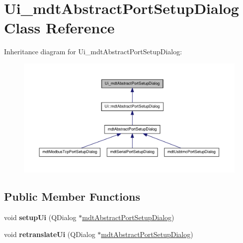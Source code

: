 \hypertarget{class_ui__mdt_abstract_port_setup_dialog}{
\section{Ui\_\-mdtAbstractPortSetupDialog Class Reference}
\label{class_ui__mdt_abstract_port_setup_dialog}
}


Inheritance diagram for Ui\_\-mdtAbstractPortSetupDialog:\nopagebreak
\begin{figure}[H]
\begin{center}
\leavevmode
\includegraphics[width=400pt]{class_ui__mdt_abstract_port_setup_dialog__inherit__graph}
\end{center}
\end{figure}
\subsection*{Public Member Functions}
\begin{DoxyCompactItemize}
\item 
\hypertarget{class_ui__mdt_abstract_port_setup_dialog_a5b5b735fa4c40a033a360f4311e193e5}{
void {\bfseries setupUi} (QDialog $\ast$\hyperlink{classmdt_abstract_port_setup_dialog}{mdtAbstractPortSetupDialog})}
\label{class_ui__mdt_abstract_port_setup_dialog_a5b5b735fa4c40a033a360f4311e193e5}

\item 
\hypertarget{class_ui__mdt_abstract_port_setup_dialog_ad28958e37ce2490217af7b0c5f02490e}{
void {\bfseries retranslateUi} (QDialog $\ast$\hyperlink{classmdt_abstract_port_setup_dialog}{mdtAbstractPortSetupDialog})}
\label{class_ui__mdt_abstract_port_setup_dialog_ad28958e37ce2490217af7b0c5f02490e}

\end{DoxyCompactItemize}
